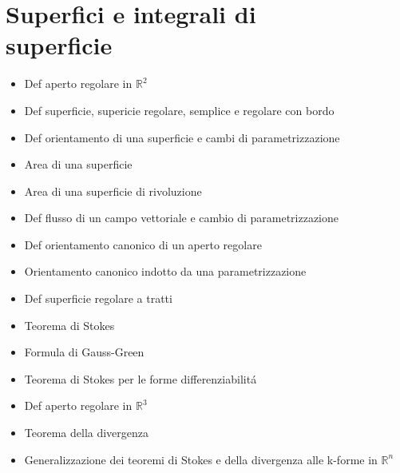 \documentclass[10pt,a4paper, twocolumn]{article}
\newcommand{\R}{\mathbb{R}}
\renewcommand{\,}{\text{, }}
\begin{document}
\section{Superfici e integrali di\\superficie}
\begin{itemize}
    \item Def aperto regolare in $\R^2$
    \item Def superficie, supericie regolare, semplice e regolare con bordo
    \item Def orientamento di una superficie e cambi di parametrizzazione
    \item Area di una superficie
    \item Area di una superficie di rivoluzione
    \item Def flusso di un campo vettoriale e cambio di parametrizzazione
    \item Def orientamento canonico di un aperto regolare
    \item Orientamento canonico indotto da una parametrizzazione
    \item Def superficie regolare a tratti
    \item Teorema di Stokes
    \item Formula di Gauss-Green
    \item Teorema di Stokes per le forme differenziabilit\'a
    \item Def aperto regolare in $\R^3$
    \item Teorema della divergenza
    \item Generalizzazione dei teoremi di Stokes e della divergenza alle k-forme in $\R^n$
\end{itemize}
\end{document}
